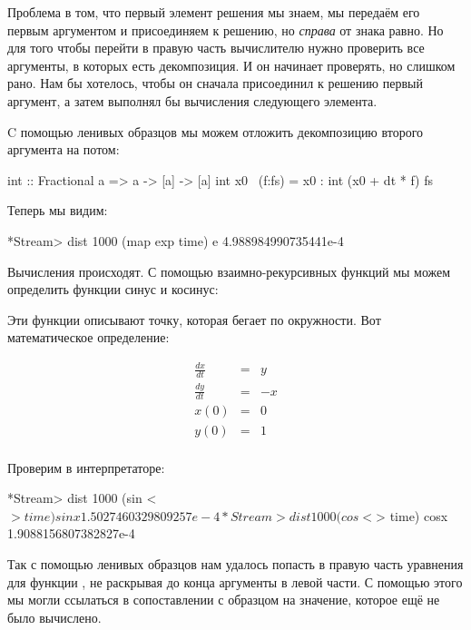 Проблема в том, что первый элемент решения мы знаем, 
мы передаём его первым аргументом и присоединяем к 
решению, но \emph{справа} от знака равно. Но для того
чтобы перейти в правую часть вычислителю нужно
проверить все аргументы, в которых есть декомпозиция. 
И он начинает проверять, но слишком рано. Нам бы хотелось,
чтобы он сначала присоединил к решению первый аргумент,
а затем выполнял бы вычисления следующего элемента. 

C помощью ленивых образцов
мы можем отложить декомпозицию второго аргумента на потом:

\begin{code}
int :: Fractional a => a -> [a] -> [a]
int x0 ~(f:fs) = x0 : int (x0 + dt * f) fs
\end{code}

Теперь мы видим:

\begin{code}
*Stream> dist 1000 (map exp time) e
4.988984990735441e-4
\end{code}

Вычисления происходят. С помощью взаимно-рекурсивных
функций мы можем определить функции синус и косинус:


Эти функции описывают точку, которая бегает по окружности.
Вот математическое определение:

\begin{eqnarray*}
\frac{dx}{dt}  &=& y \\
\frac{dy}{dt}  &=& - x \\
x(0)           &=& 0 \\
y(0)           &=& 1 \\
\end{eqnarray*}

Проверим в интерпретаторе:

\begin{code}
*Stream> dist 1000 (sin <$> time) sinx
1.5027460329809257e-4
*Stream> dist 1000 (cos <$> time) cosx
1.9088156807382827e-4
\end{code}

Так с помощью ленивых образцов нам удалось попасть
в правую часть уравнения для функции , не раскрывая 
до конца аргументы
в левой части. С помощью этого мы могли ссылаться 
в сопоставлении с образцом на значение, которое ещё не 
было вычислено.

